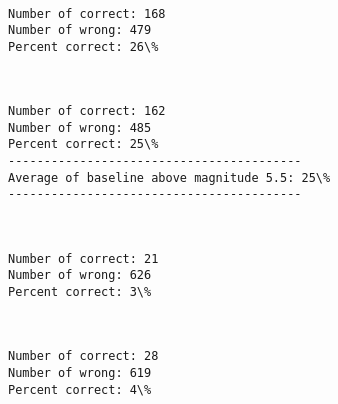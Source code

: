 \documentclass[11pt]{article}
\begin{document}
    \begin{center}
    \end{center}
    { \hspace*{\fill} \\}
    
    \begin{Verbatim}[commandchars=\\\{\}]
Number of correct: 168
Number of wrong: 479
Percent correct: 26\%

    \end{Verbatim}

    \begin{center}
    \end{center}
    { \hspace*{\fill} \\}
    
    \begin{Verbatim}[commandchars=\\\{\}]
Number of correct: 162
Number of wrong: 485
Percent correct: 25\%
-----------------------------------------
Average of baseline above magnitude 5.5: 25\%
-----------------------------------------

    \end{Verbatim}

    \begin{center}
    \end{center}
    { \hspace*{\fill} \\}
    
    \begin{Verbatim}[commandchars=\\\{\}]
Number of correct: 21
Number of wrong: 626
Percent correct: 3\%

    \end{Verbatim}

    \begin{center}
    \end{center}
    { \hspace*{\fill} \\}
    
    \begin{Verbatim}[commandchars=\\\{\}]
Number of correct: 28
Number of wrong: 619
Percent correct: 4\%

    \end{Verbatim}
\end{document}
